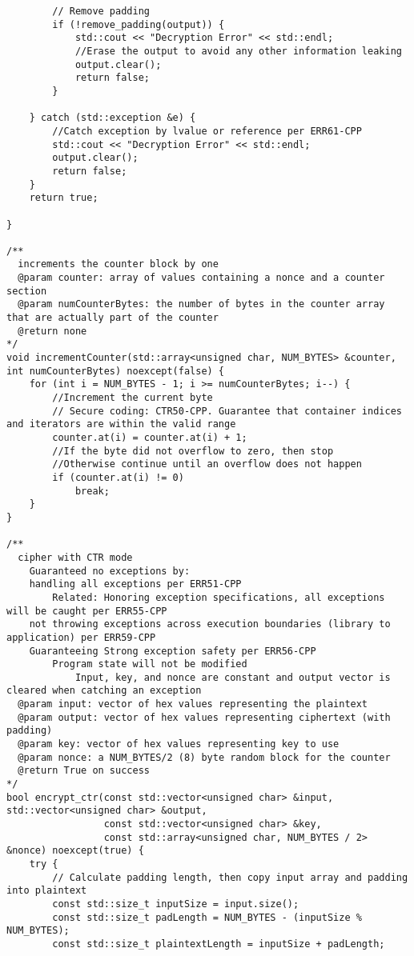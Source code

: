 \documentclass[a4paper,12pt]{article}
\begin{document}
{\begin{lstlisting}
        // Remove padding
        if (!remove_padding(output)) {
            std::cout << "Decryption Error" << std::endl;
            //Erase the output to avoid any other information leaking
            output.clear();
            return false;
        }

    } catch (std::exception &e) {
        //Catch exception by lvalue or reference per ERR61-CPP
        std::cout << "Decryption Error" << std::endl;
        output.clear();
        return false;
    }
    return true;

}

/**
  increments the counter block by one
  @param counter: array of values containing a nonce and a counter section
  @param numCounterBytes: the number of bytes in the counter array that are actually part of the counter
  @return none
*/
void incrementCounter(std::array<unsigned char, NUM_BYTES> &counter, int numCounterBytes) noexcept(false) {
    for (int i = NUM_BYTES - 1; i >= numCounterBytes; i--) {
        //Increment the current byte
        // Secure coding: CTR50-CPP. Guarantee that container indices and iterators are within the valid range
        counter.at(i) = counter.at(i) + 1;
        //If the byte did not overflow to zero, then stop
        //Otherwise continue until an overflow does not happen
        if (counter.at(i) != 0)
            break;
    }
}

/**
  cipher with CTR mode
    Guaranteed no exceptions by:
    handling all exceptions per ERR51-CPP
        Related: Honoring exception specifications, all exceptions will be caught per ERR55-CPP
    not throwing exceptions across execution boundaries (library to application) per ERR59-CPP
    Guaranteeing Strong exception safety per ERR56-CPP
        Program state will not be modified
            Input, key, and nonce are constant and output vector is cleared when catching an exception
  @param input: vector of hex values representing the plaintext
  @param output: vector of hex values representing ciphertext (with padding)
  @param key: vector of hex values representing key to use
  @param nonce: a NUM_BYTES/2 (8) byte random block for the counter
  @return True on success
*/
bool encrypt_ctr(const std::vector<unsigned char> &input, std::vector<unsigned char> &output,
                 const std::vector<unsigned char> &key,
                 const std::array<unsigned char, NUM_BYTES / 2> &nonce) noexcept(true) {
    try {
        // Calculate padding length, then copy input array and padding into plaintext
        const std::size_t inputSize = input.size();
        const std::size_t padLength = NUM_BYTES - (inputSize % NUM_BYTES);
        const std::size_t plaintextLength = inputSize + padLength;


\end{lstlisting}}
\end{document}
